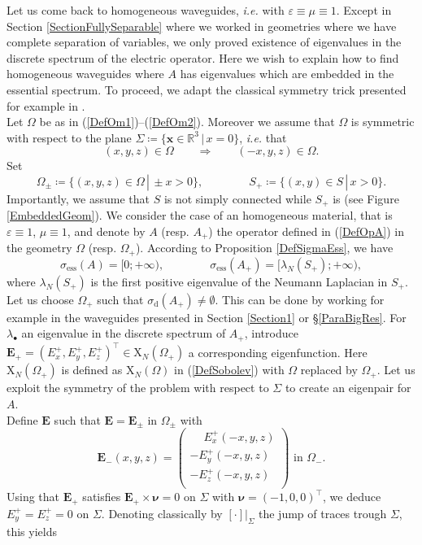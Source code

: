 \documentclass[11pt,a4paper]{article}
\newcommand{\eps}{\varepsilon}
\newcommand{\Om}{\Omega}
\newcommand{\mrm}[1]{\mathrm{#1}}
\newcommand{\bfx}{\boldsymbol{x}}
\newcommand{\bfnu}{\boldsymbol{\nu}}
\newcommand{\R}{\mathbb{R}}
\newcommand{\mX}{\mrm{X}}
\def\E{\boldsymbol{E}}
\begin{document}
\noindent Let us come back to homogeneous waveguides, \textit{i.e.} with $\eps\equiv\mu\equiv1$. Except in Section \ref{SectionFullySeparable} where we worked in geometries where we have complete separation of variables, we only proved existence of eigenvalues in the discrete spectrum of the electric operator. Here we wish to explain how to find homogeneous waveguides where $A$ has eigenvalues which are embedded in the essential spectrum. To proceed, we adapt the classical symmetry trick presented for example in \cite{EvLV94}.\\
\newline
Let $\Om$ be as in (\ref{DefOm1})--(\ref{DefOm2}). Moreover we assume that $\Om$ is symmetric with respect to the plane $\Sigma\coloneqq\{\bfx\in\R^3\,|\,x=0\}$, \textit{i.e.} that
\[
(x,y,z)\in\Om\qquad\Rightarrow\qquad (-x,y,z)\in\Om.
\]
Set 
\[
\Om_\pm\coloneqq\{(x,y,z)\in\Om\,|\,\pm x>0\},\qquad\qquad S_+\coloneqq\{(x,y)\in S\,|\,x>0\}.
\]
Importantly, we assume that $S$ is not simply connected while $S_+$ is (see Figure \ref{EmbeddedGeom}). We consider the case of an homogeneous material, that is $\eps\equiv1$, $\mu\equiv1$, and denote by $A$ (resp. $A_+$) the operator defined in (\ref{DefOpA}) in the geometry $\Om$ (resp. $\Om_+$). According to Proposition \ref{DefSigmaEss}, we have  
\[
\sigma_{\mrm{ess}}(A)=[0;+\infty),\qquad\qquad \sigma_{\mrm{ess}}(A_+)=[\lambda_N(S_+);+\infty),
\]
where $\lambda_N(S_+)$ is the first positive eigenvalue of the Neumann Laplacian in $S_+$. Let us choose $\Om_+$ such that $\sigma_{\mrm{d}}(A_+)\ne\emptyset$. This can be done by working for example in the waveguides presented in Section \ref{Section1} or \S\ref{ParaBigRes}. For $\lambda_\bullet$ an eigenvalue in the discrete spectrum of $A_+$, introduce $\E_+=(E^+_x,E^+_y,E^+_z)^\top\in\boldsymbol{\mX}_N(\Om_+)$ a corresponding eigenfunction. Here $\boldsymbol{\mX}_N(\Om_+)$ is defined as $\boldsymbol{\mX}_N(\Om)$ in (\ref{DefSobolev}) with $\Om$ replaced by $\Om_+$. Let us exploit the symmetry of the problem with respect to $\Sigma$ to create an eigenpair for $A$.\\
\newline
Define $\E$ such that $\E=\E_\pm$ in $\Om_\pm$ with 
\[
\E_-(x,y,z)=\left(\begin{array}{c}
\phantom{-}E^+_x(-x,y,z)\\
-E^+_y(-x,y,z)\\
-E^+_z(-x,y,z)\\
\end{array}
\right)\mbox{ in }\Om_-.
\]
Using that $\E_+$ satisfies $\E_+\times\bfnu=0$ on $\Sigma$ with $\bfnu=(-1,0,0)^\top$, we deduce $E^+_y=E^+_z=0$ on $\Sigma$. Denoting classically by $[\cdot]|_{\Sigma}$ the jump of traces trough $\Sigma$, this yields
\end{document}
